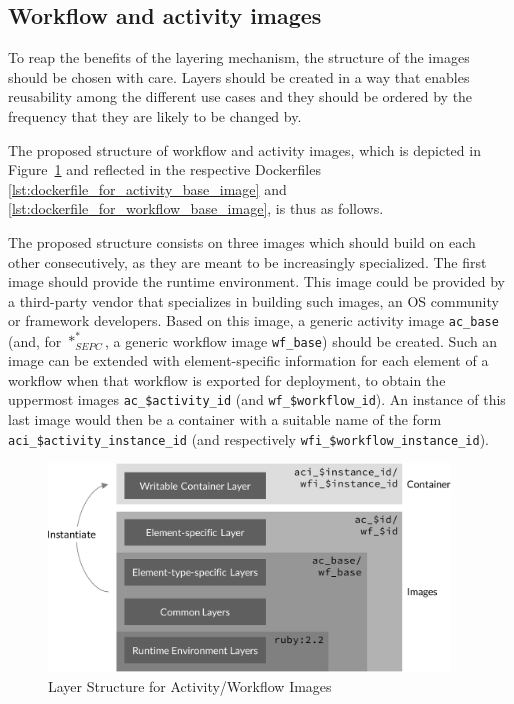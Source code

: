 
\subsection{Workflow and activity images} %
\label{sub:workflow_activity_images}
  To reap the benefits of the layering mechanism, the structure of the images should be chosen with care. Layers should be created in a way that enables reusability among the different use cases and they should be ordered by the frequency that they are likely to be changed by.

  The proposed structure of workflow and activity images, which is depicted in Figure~\ref{fig:layers_for_element_wrapping_containers} and reflected in the respective Dockerfiles \ref{lst:dockerfile_for_activity_base_image} and \ref{lst:dockerfile_for_workflow_base_image}, is thus as follows.

  The proposed structure consists on three images which should build on each other consecutively, as they are meant to be increasingly specialized. The first image should provide the runtime environment. This image could be provided by a third-party vendor that specializes in building such images, \ie an \ac{OS} community or framework developers. Based on this image, a generic activity image \texttt{ac\_base} (and, for $*_{SEPC}^{*}$, a generic workflow image \texttt{wf\_base}) should be created. Such an image can be extended with element-specific information for each element of a workflow when that workflow is exported for deployment, to obtain the uppermost images \texttt{ac\_\$activity\_id} (and \texttt{wf\_\$workflow\_id}). An instance of this last image would then be a container with a suitable name of the form \texttt{aci\_\$activity\_instance\_id} (and respectively \texttt{wfi\_\$workflow\_instance\_id}).

  \begin{figure}[htbp]
    \centering
    \includegraphics[width=0.95\textwidth]{content/images/layer_concept-crop.pdf}
    \caption{Layer Structure for Activity/Workflow Images}
    \label{fig:layers_for_element_wrapping_containers}
  \end{figure}


